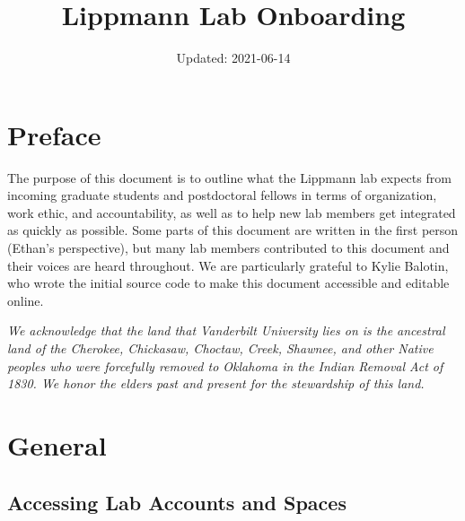 \documentclass[
]{book}
\title{Lippmann Lab Onboarding}
\date{Updated: 2021-06-14}
\begin{document}
\maketitle

{
\setcounter{tocdepth}{1}
\tableofcontents
}
\hypertarget{preface}{%
\chapter*{Preface}\label{preface}}

The purpose of this document is to outline what the Lippmann lab expects from incoming graduate students and postdoctoral fellows in terms of organization, work ethic, and accountability, as well as to help new lab members get integrated as quickly as possible. Some parts of this document are written in the first person (Ethan's perspective), but many lab members contributed to this document and their voices are heard throughout. We are particularly grateful to Kylie Balotin, who wrote the initial source code to make this document accessible and editable online.

\emph{We acknowledge that the land that Vanderbilt University lies on is the ancestral land of the Cherokee, Chickasaw, Choctaw, Creek, Shawnee, and other Native peoples who were forcefully removed to Oklahoma in the Indian Removal Act of 1830. We honor the elders past and present for the stewardship of this land.}

\hypertarget{general}{%
\chapter{General}\label{general}}

\hypertarget{access}{%
\section{Accessing Lab Accounts and Spaces}\label{access}}
\end{document}

